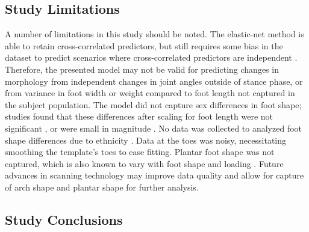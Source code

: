 \documentclass[defaultstyle,11pt]{comps}
\begin{document}
\hypertarget{study-limitations}{%
\subsection{Study Limitations}\label{study-limitations}}

A number of limitations in this study should be noted.
The elastic-net method is able to retain cross-correlated predictors, but still requires some bias in the dataset to predict scenarios where cross-correlated predictors are independent \citep{Zou2005}.
Therefore, the presented model may not be valid for predicting changes in morphology from independent changes in joint angles outside of stance phase, or from variance in foot width or weight compared to foot length not captured in the subject population.
The model did not capture sex differences in foot shape; studies found that these differences after scaling for foot length were not significant \citep{Kouchi2009, Barisch-Fritz2014a, Conrad2019}, or were small in magnitude \citep{Wunderlich2001, Krauss2008}.
No data was collected to analyzed foot shape differences due to ethnicity \citep{Jurca2019}.
Data at the toes was noisy, necessitating smoothing the template's toes to ease fitting.
Plantar foot shape was not captured, which is also known to vary with foot shape and loading \citep{Mei2020}.
Future advances in scanning technology may improve data quality and allow for capture of arch shape and plantar shape for further analysis.

\hypertarget{study-conclusions}{%
\subsection{Study Conclusions}\label{study-conclusions}}
\end{document}
